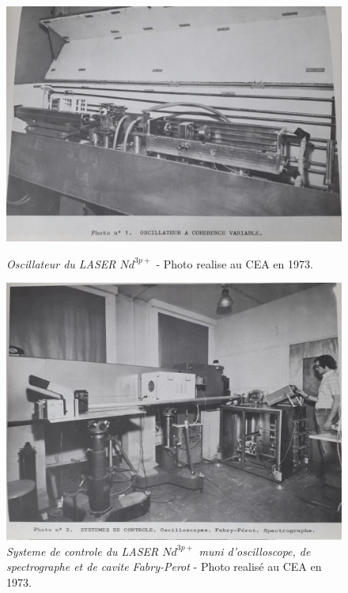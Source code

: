 \documentclass[a4paper,12pt]{article}
\begin{document}
\begin{appendix}
\begin{figure}
\centering
\includegraphics[width=14.5cm,height=8.6cm]{./figures/oscillateur-CEA-multiphotonGroup.jpg}
\caption[Vue de l'oscillateur du LASER $Nd^{3p+}$]{\textit{Oscillateur du LASER $Nd^{3p+}$ } - Photo realise au CEA en 1973.} 
\label{fig:9:figure9}
\end{figure}

\begin{figure}
\centering
\includegraphics[width=14.5cm,height=8.6cm]{./figures/ControlSystemOscilloFabryPerot-CEA-multiphotonGroup.jpg}
\caption[Vue du systeme de controle du LASER $Nd^{3p+}$]{\textit{Systeme de controle du LASER $Nd^{3p+}$ muni d'oscilloscope, de spectrographe et de cavite Fabry-Perot} - Photo realisé au CEA en 1973.} 
\label{fig:10:figure10}
\end{figure}



\end{appendix}
\end{document}
